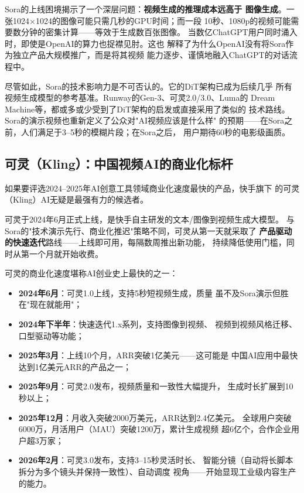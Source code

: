 Sora的上线困境揭示了一个深层问题：\textbf{视频生成的推理成本远高于
图像生成}。一张1024$\times$1024的图像可能只需几秒的GPU时间；而一段
10秒、1080p的视频可能需要数分钟的密集计算——等效于生成数百张图像。
当数亿ChatGPT用户同时涌入时，即使是OpenAI的算力也捉襟见肘。这也
解释了为什么OpenAI没有将Sora作为独立产品大规模推广，而是将其视频
能力逐步、谨慎地融入ChatGPT的对话流程中。

尽管如此，Sora的技术影响力是不可否认的。它的DiT架构已成为后续几乎
所有视频生成模型的参考基准。Runway的Gen-3、可灵2.0/3.0、Luma的
Dream Machine等，都或多或少受到了DiT架构的启发或直接采用了类似的
技术路线。Sora的演示视频也重新定义了公众对"AI视频应该是什么样"
的预期——在Sora之前，人们满足于3--5秒的模糊片段；在Sora之后，
用户期待60秒的电影级画质。

\subsection{可灵（Kling）：中国视频AI的商业化标杆}
\label{subsec:kling}

如果要评选2024--2025年AI创意工具领域商业化速度最快的产品，快手旗下
的可灵（Kling）AI无疑是最强有力的候选者。

可灵于2024年6月正式上线，是快手自主研发的文本/图像到视频生成大模型。
与Sora的"技术演示先行、商业化推迟"策略不同，可灵从第一天就采取了
\textbf{产品驱动的快速迭代}路线——上线即可用，每隔数周推出新功能，
持续降低使用门槛，同时从第一个月就开始收费。

可灵的商业化速度堪称AI创业史上最快的之一：

\begin{itemize}
  \item \textbf{2024年6月}：可灵1.0上线，支持5秒短视频生成，质量
    虽不及Sora演示但胜在"现在就能用"；
  \item \textbf{2024年下半年}：快速迭代1.x系列，支持图像到视频、
    视频到视频风格迁移、口型驱动等功能；
  \item \textbf{2025年3月}：上线10个月，ARR突破1亿美元——这可能是
    中国AI应用中最快达到1亿美元ARR的产品之一；
  \item \textbf{2025年9月}：可灵2.0发布，视频质量和一致性大幅提升，
    生成时长扩展到10秒以上；
  \item \textbf{2025年12月}：月收入突破2000万美元，ARR达到2.4亿美元。
    全球用户突破6000万，月活用户（MAU）突破1200万，累计生成视频
    超6亿个，合作企业用户超3万家；
  \item \textbf{2026年2月}：可灵3.0发布，支持3--15秒灵活时长、
    智能分镜（自动将长脚本拆分为多个镜头并保持一致性）、自动调度
    视角——开始显现工业级内容生产的能力。
\end{itemize}

